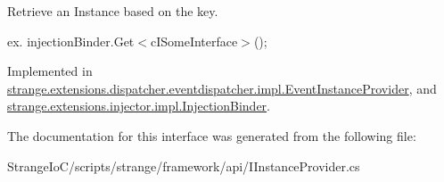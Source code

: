 Retrieve an Instance based on the key. 

ex. {\ttfamily injection\-Binder.\-Get$<$c\-I\-Some\-Interface$>$();} 

Implemented in \hyperlink{classstrange_1_1extensions_1_1dispatcher_1_1eventdispatcher_1_1impl_1_1_event_instance_provider_a0495fd565e76da8d0262359643c40084}{strange.\-extensions.\-dispatcher.\-eventdispatcher.\-impl.\-Event\-Instance\-Provider}, and \hyperlink{classstrange_1_1extensions_1_1injector_1_1impl_1_1_injection_binder_a6935985cf687fc03af25385781caf01e}{strange.\-extensions.\-injector.\-impl.\-Injection\-Binder}.



The documentation for this interface was generated from the following file\-:\begin{DoxyCompactItemize}
\item 
Strange\-Io\-C/scripts/strange/framework/api/I\-Instance\-Provider.\-cs\end{DoxyCompactItemize}
